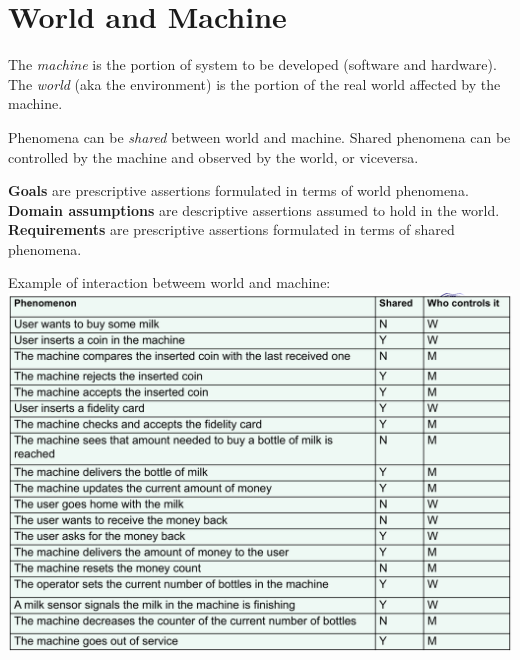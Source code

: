 \section{World and Machine}
The \emph{machine} is the portion of system to be developed (software and hardware).
The \emph{world} (aka the environment) is the portion of the real world affected by the machine.

Phenomena can be \emph{shared} between world and machine.
Shared phenomena can be controlled by the machine and observed by the world, or viceversa.

\textbf{Goals} are prescriptive assertions formulated in terms of world phenomena.\\
\textbf{Domain assumptions} are descriptive assertions assumed to hold in the world.\\
\textbf{Requirements} are prescriptive assertions formulated in terms of shared phenomena.

Example of interaction betweem world and machine:
\includegraphics[width=\linewidth]{3-world-machine/shared-example.png}